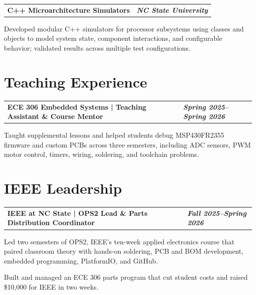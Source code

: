 \documentclass[10pt,letterpaper]{article}
\makeatletter
\newcommand{\resumeentry}[2]{%
  \begin{tabularx}{\textwidth}{@{}X>{\raggedleft\arraybackslash}p{2.40in}@{}}
    \textbf{#1} & \textbf{\textit{#2}}
  \end{tabularx}\vspace{-0.075cm}
}
\makeatother
\begin{document}
\resumeentry{C++ Microarchitecture Simulators}{NC State University}
\begin{resumebullets}
  \item Developed modular C++ simulators for processor subsystems using classes and objects to model system state, component interactions, and configurable behavior; validated results across multiple test configurations.
\end{resumebullets}



\section{Teaching Experience}
\resumeentry{ECE 306 Embedded Systems | Teaching Assistant \& Course Mentor}{Spring 2025--Spring 2026}
\begin{resumebullets}
  \item Taught supplemental lessons and helped students debug MSP430FR2355 firmware and custom PCBs across three semesters, including ADC sensors, PWM motor control, timers, wiring, soldering, and toolchain problems.
\end{resumebullets}

\section{IEEE Leadership}
\resumeentry{IEEE at NC State | OPS2 Lead \& Parts Distribution Coordinator}{Fall 2025--Spring 2026}
\begin{resumebullets}
  \item Led two semesters of OPS2, IEEE's ten-week applied electronics course that paired classroom theory with hands-on soldering, PCB and BOM development, embedded programming, PlatformIO, and GitHub.
  \item Built and managed an ECE 306 parts program that cut student costs and raised \$10,000 for IEEE in two weeks.
\end{resumebullets}
\end{document}
